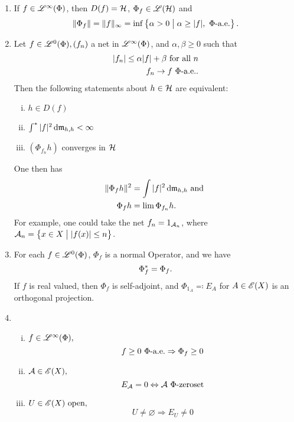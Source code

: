 \begin{thrm} \label{maintheorem}
  \leavevmode
  \begin{enumerate}
   \item   

 If $f \in \mathscr{L}^\infty (\Phi)$, then $D(f) = \mathcal{H}$, $ \Phi_f \in \mathscr{L}(\mathcal{H})$ and
 \[
 \| \Phi_f \| = \| f\|_\infty = \inf \left\lbrace \alpha > 0 \bigm | \alpha \geq |f|, ~\Phi\text{-a.e.}\right\rbrace.
 \]

 
\item 
Let $f \in \mathscr{L}^0(\Phi), (f_n)$ a net in $\mathscr{L}^\infty (\Phi)$, and $\alpha, \beta \geq 0$ such that
 \begin{align*}
   | f_n | \leq \alpha |f| + \beta \text{ for all } n \\
   f_n \to f ~\Phi\text{-a.e.}.
 \end{align*}
Then the following statements about $h \in \mathcal{H}$ are equivalent:
\begin{enumerate}[(i)]
 \item $h \in D(f)$
 \item $\int ^{*} | f| ^2 \operatorname{d}\! \mathfrak{m}_{h,h} < \infty$
 \item $(\Phi_{f_n}h)$ converges in $ \mathcal{H}$
\end{enumerate}
One then has
\begin{align*}
  \| \Phi_f h \| ^2 &= \int |f|^2 \operatorname{d}\! \mathfrak{m}_{h, h } \text{ and }\\
  \Phi_{f }h &= \lim \Phi_{f_n} h.
\end{align*}
For example, one could take the net $f_n = 1_{\mathcal{A}_n}$,  where
$\mathcal{A}_n = \left\lbrace x \in X \bigm | | f(x) | \leq n \right\rbrace$.

\item
For each $f \in \mathscr{L}^0(\Phi)$, $\Phi_f$ is a normal Operator, and we have
\[
 \Phi_f ^{*} = \Phi_f. 
\]
If $f$ is real valued, then $\Phi_f$ is self-adjoint, and $\Phi_{1_A} 
\eqqcolon E_A$ for $ A \in \mathscr{E}(X)$ is an orthogonal projection. 
\item
\begin{enumerate}[(i)]
  \item $f \in \mathscr{L}^\infty (\Phi),$ 
  \[
   f \geq 0 ~\Phi\text{-a.e.} \Rightarrow \Phi_f \geq 0
  \]

  \item $\mathcal{A} \in \mathscr{E}(X),$
  \[
  E_\mathcal{A} =0  \Leftrightarrow \mathcal{A} ~\Phi\text{-zeroset}
  \]
  \item $U \in \mathscr{E}(X)\text{ open,}$ 
  \[
   U \neq \varnothing \Rightarrow E_U \neq 0
  \]

 \end{enumerate}



\end{enumerate}
\end{thrm}
